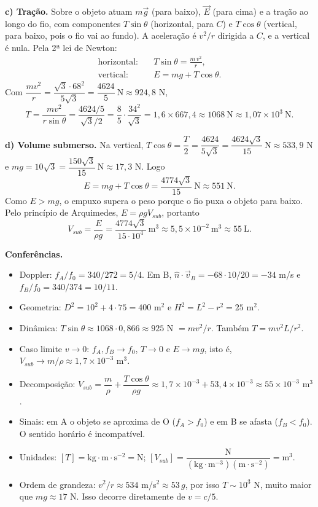 \documentclass{article}%
\begin{document}
\textbf{c) Tração.} Sobre o objeto atuam $m\vec g$ (para baixo), $\vec E$ (para cima) e a tração ao longo do fio, com componentes $T\sin\theta$ (horizontal, para $C$) e $T\cos\theta$ (vertical, para baixo, pois o fio vai ao fundo). A aceleração é $v^2/r$ dirigida a $C$, e a vertical é nula. Pela 2ª lei de Newton:
\begin{align*}
\text{horizontal:}\quad & T\sin\theta=\frac{m\,v^2}{r},\\
\text{vertical:}\quad & E=mg+T\cos\theta.
\end{align*}
Com $\dfrac{m v^2}{r}=\dfrac{\sqrt3\cdot 68^2}{5\sqrt3}=\dfrac{4624}{5}\ \text{N}\approx 924{,}8$ N,
\[
T=\frac{m v^2}{r\sin\theta}=\frac{4624/5}{\sqrt3/2}=\frac85\cdot\frac{34^2}{\sqrt3}=1{,}6\times 667{,}4\approx 1068\ \text{N}\approx 1{,}07\times 10^{3}\ \text{N}.
\]

\textbf{d) Volume submerso.} Na vertical, $T\cos\theta=\dfrac T2=\dfrac{4624}{5\sqrt3}=\dfrac{4624\sqrt3}{15}\ \text{N}\approx 533{,}9$ N e $mg=10\sqrt3=\dfrac{150\sqrt3}{15}\ \text{N}\approx 17{,}3$ N. Logo
\[
E=mg+T\cos\theta=\frac{4774\sqrt3}{15}\ \text{N}\approx 551\ \text{N}.
\]
Como $E>mg$, o empuxo supera o peso porque o fio puxa o objeto para baixo. Pelo princípio de Arquimedes, $E=\rho g V_{sub}$, portanto
\[
V_{sub}=\frac{E}{\rho g}=\frac{4774\sqrt3}{15\cdot 10^{4}}\ \text{m}^3\approx 5{,}5\times 10^{-2}\ \text{m}^3\approx 55\ \text{L}.
\]

\textbf{Conferências.}
\begin{itemize}
\item Doppler: $f_A/f_0=340/272=5/4$. Em B, $\hat n\cdot\vec v_B=-68\cdot 10/20=-34$ m/s e $f_B/f_0=340/374=10/11$.
\item Geometria: $D^2=10^2+4\cdot 75=400$ m$^2$ e $H^2=L^2-r^2=25$ m$^2$.
\item Dinâmica: $T\sin\theta\approx 1068\cdot 0{,}866\approx 925$ N $=mv^2/r$. Também $T=mv^2L/r^2$.
\item Caso limite $v\to 0$: $f_A,f_B\to f_0$, $T\to 0$ e $E\to mg$, isto é, $V_{sub}\to m/\rho\approx 1{,}7\times 10^{-3}$ m$^3$.
\item Decomposição: $V_{sub}=\dfrac{m}{\rho}+\dfrac{T\cos\theta}{\rho g}\approx 1{,}7\times 10^{-3}+53{,}4\times 10^{-3}\approx 55\times 10^{-3}$ m$^3$.
\item Sinais: em A o objeto se aproxima de O ($f_A>f_0$) e em B se afasta ($f_B<f_0$). O sentido horário é incompatível.
\item Unidades: $[T]=\text{kg}\cdot\text{m}\cdot\text{s}^{-2}=\text{N}$; $[V_{sub}]=\dfrac{\text{N}}{(\text{kg}\cdot\text{m}^{-3})(\text{m}\cdot\text{s}^{-2})}=\text{m}^3$.
\item Ordem de grandeza: $v^2/r\approx 534$ m/s$^2\approx 53\,g$, por isso $T\sim 10^3$ N, muito maior que $mg\approx 17$ N. Isso decorre diretamente de $v=c/5$.
\end{itemize}
\end{document}
